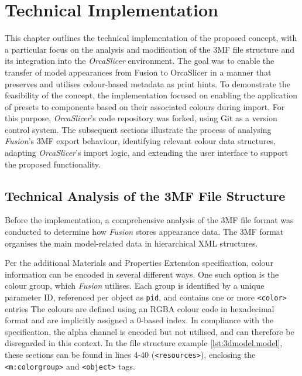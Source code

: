 \chapter{Technical Implementation}\label{ch:method}

This chapter outlines the technical implementation of the proposed concept, with a particular focus on the analysis and modification of the 3MF file structure and its integration into the \textit{OrcaSlicer} environment. 
The goal was to enable the transfer of model appearances from Fusion to OrcaSlicer in a manner that preserves and utilises colour-based metadata as print hints.
To demonstrate the feasibility of the concept, the implementation focused on enabling the application of presets to components based on their associated colours during import.
For this purpose, \textit{OrcaSlicer}'s code repository was forked, using Git as a version control system. 
The subsequent sections illustrate the process of analysing \textit{Fusion}’s 3MF export behaviour, identifying relevant colour data structures, adapting \textit{OrcaSlicer}'s import logic, and extending the user interface to support the proposed functionality.

\section{Technical Analysis of the 3MF File Structure}

Before the implementation, a comprehensive analysis of the 3MF file format was conducted to determine how \textit{Fusion} stores appearance data. 
The 3MF format organises the main model-related data in hierarchical XML structures.

Per the additional Materials and Properties Extension specification\cite{3mf_consortium_materials_2025}, colour information can be encoded in several different ways.
One such option is the colour group, which \textit{Fusion} utilises. 
Each group is identified by a unique parameter ID, referenced per object as \texttt{pid}, and contains one or more \texttt{<color>} entries
The colours are defined using an RGBA colour code in hexadecimal format and are implicitly assigned a 0-based index. 
In compliance with the specification, the alpha channel is encoded but not utilised, and can therefore be disregarded in this context.
In the file structure example \ref{lst:3dmodel.model}, these sections can be found in lines 4-40 (\texttt{<resources>}), enclosing the \texttt{<m:colorgroup>} and \texttt{<object>} tags.

